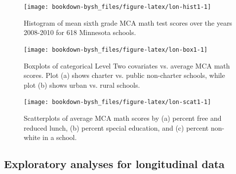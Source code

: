 \documentclass[
]{krantz}
\begin{document}
\begin{figure}

{\centering \texttt{[image: bookdown-bysh\_files/figure-latex/lon-hist1-1]} 

}

\caption{Histogram of mean sixth grade MCA math test scores over the years 2008-2010 for 618 Minnesota schools.}\label{fig:lon-hist1}
\end{figure}

\begin{figure}

{\centering \texttt{[image: bookdown-bysh\_files/figure-latex/lon-box1-1]} 

}

\caption{Boxplots of categorical Level Two covariates vs. average MCA math scores.  Plot (a) shows charter vs. public non-charter schools, while plot (b) shows urban vs. rural schools.}\label{fig:lon-box1}
\end{figure}

\begin{figure}

{\centering \texttt{[image: bookdown-bysh\_files/figure-latex/lon-scat1-1]} 

}

\caption{ Scatterplots of average MCA math scores by (a) percent free and reduced lunch, (b) percent special education, and (c) percent non-white in a school.}\label{fig:lon-scat1}
\end{figure}

\hypertarget{longitudinalanalyses}{%
\subsection{Exploratory analyses for longitudinal data}\label{longitudinalanalyses}}
\end{document}
